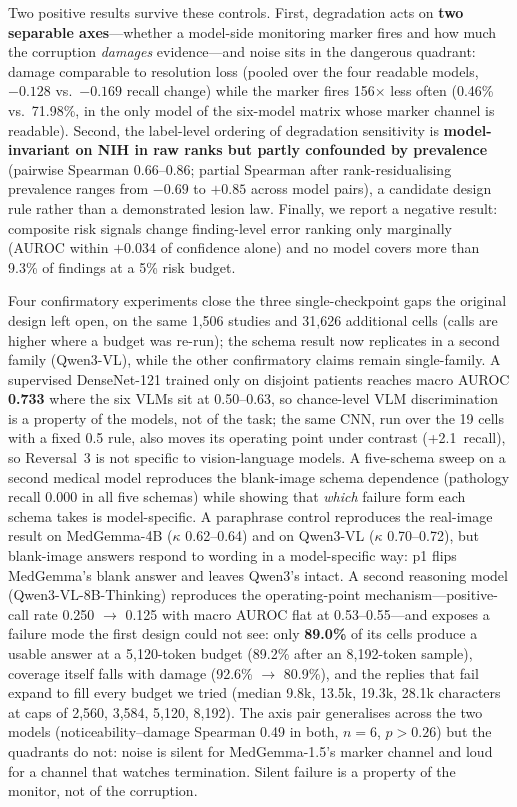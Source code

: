 Two positive results survive these controls. First, degradation acts on \textbf{two separable axes}---whether a model-side monitoring marker fires and how much the corruption \emph{damages} evidence---and noise sits in the dangerous quadrant: damage comparable to resolution loss (pooled over the four readable models, $-0.128$ vs.\ $-0.169$ recall change) while the marker fires 156$\times$ less often (0.46\% vs.\ 71.98\%, in the only model of the six-model matrix whose marker channel is readable). Second, the label-level ordering of degradation sensitivity is \textbf{model-invariant on NIH in raw ranks but partly confounded by prevalence} (pairwise Spearman 0.66--0.86; partial Spearman after rank-residualising prevalence ranges from $-0.69$ to $+0.85$ across model pairs), a candidate design rule rather than a demonstrated lesion law. Finally, we report a negative result: composite risk signals change finding-level error ranking only marginally (AUROC within $+0.034$ of confidence alone) and no model covers more than 9.3\% of findings at a 5\% risk budget.

Four confirmatory experiments close the three single-checkpoint gaps the original design left open, on the same 1,506 studies and 31,626 additional cells (calls are higher where a budget was re-run); the schema result now replicates in a second family (Qwen3-VL), while the other confirmatory claims remain single-family. A supervised DenseNet-121 trained only on disjoint patients reaches macro AUROC \textbf{0.733} where the six VLMs sit at 0.50--0.63, so chance-level VLM discrimination is a property of the models, not of the task; the same CNN, run over the 19 cells with a fixed 0.5 rule, also moves its operating point under contrast (+2.1\,\pp{} recall), so Reversal~3 is not specific to vision-language models. A five-schema sweep on a second medical model reproduces the blank-image schema dependence (pathology recall 0.000 in all five schemas) while showing that \emph{which} failure form each schema takes is model-specific. A paraphrase control reproduces the real-image result on MedGemma-4B ($\kappa$ 0.62--0.64) and on Qwen3-VL ($\kappa$ 0.70--0.72), but blank-image answers respond to wording in a model-specific way: p1 flips MedGemma's blank answer and leaves Qwen3's intact. A second reasoning model (Qwen3-VL-8B-Thinking) reproduces the operating-point mechanism---positive-call rate 0.250 $\rightarrow$ 0.125 with macro AUROC flat at 0.53--0.55---and exposes a failure mode the first design could not see: only \textbf{89.0\%} of its cells produce a usable answer at a 5,120-token budget (89.2\% after an 8,192-token sample), coverage itself falls with damage (92.6\% $\rightarrow$ 80.9\%), and the replies that fail expand to fill every budget we tried (median 9.8k, 13.5k, 19.3k, 28.1k characters at caps of 2,560, 3,584, 5,120, 8,192). The axis pair generalises across the two models (noticeability--damage Spearman 0.49 in both, $n=6$, $p>0.26$) but the quadrants do not: noise is silent for MedGemma-1.5's marker channel and loud for a channel that watches termination. Silent failure is a property of the monitor, not of the corruption.

